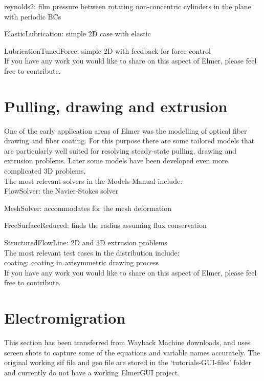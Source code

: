    reynolds2: film pressure between rotating non-concentric cylinders in the plane with periodic BCs

    ElasticLubrication: simple 2D case with elastic

    LubricationTunedForce: simple 2D with feedback for force control\\

\noindent If you have any work you would like to share on this aspect of Elmer, please feel free to contribute. 

\section{Pulling, drawing and extrusion}

One of the early application areas of Elmer was the modelling of optical fiber drawing and fiber coating. For this purpose there are some tailored models that are particularly well suited for resolving steady-state pulling, drawing and extrusion problems. Later some models have been developed even more complicated 3D problems.\\

\noindent The most relevant solvers in the Models Manual include:\\

    FlowSolver: the Navier-Stokes solver

    MeshSolver: accommodates for the mesh deformation

    FreeSurfaceReduced: finds the radius assuming flux conservation

    StructuredFlowLine: 2D and 3D extrusion problems\\

\noindent The most relevant test cases in the distribution include:\\

    coating: coating in axisymmetric drawing process\\

\noindent If you have any work you would like to share on this aspect of Elmer, please feel free to contribute. 

\section{Electromigration}

This section has been transferred from Wayback Machine downloads, and uses screen shots to capture some of the equations and variable names accurately.  The original working sif file and geo file are stored in the `tutorials-GUI-files' folder and currently do not have a working ElmerGUI project.

